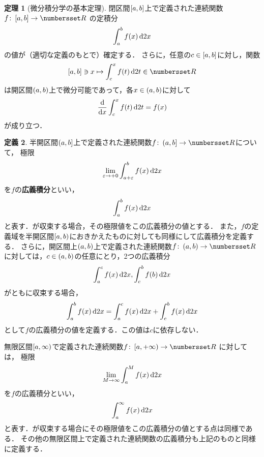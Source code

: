 \documentclass[11pt,a4paper]{ltjsarticle}
\newcommand*{\definition}[1]{\textbf{#1}}
\newcommand*{\intd}{\dl2}
\theoremstyle{definition}
\newtheorem{dfn}{定義}[section]
\newtheorem{thm}[dfn]{定理}
\begin{document}
\begin{thm}[微分積分学の基本定理] \label{thm:int}
  閉区間$\interval{c}{a,b}$上で定義された連続関数$f \colon \interval{c}{a,b} \to \Real$
  の定積分
  \begin{align}
    \int_a^b \apply{f}{x} \intd x
    \label{eq:int}
  \end{align}
  の値が（適切な定義のもとで）確定する．
  さらに，任意の$c \in \interval{c}{a,b}$に対し，関数
  \[
    \interval{c}{a,b} \ni x \mapsto \int_c^x \apply{f}{t} \intd t \in \Real
  \]
  は開区間$\interval{op}{a,b}$上で微分可能であって，各$x \in \interval{op}{a,b}$に対して
  \begin{align}
    \diff*{\int_c^x \apply{f}{t} \intd t}x = \apply{f}{x}
    \label{eq:intderi}
  \end{align}
  が成り立つ．
\end{thm}

\begin{dfn} \label{dfn:impint}
  半開区間$\interval{lop}{a,b}$上で定義された連続関数$f \colon \interval{lop}{a,b} \to \Real$について，
  極限
  \begin{align}
    \lim_{\varepsilon \to +0} \int_{a + \varepsilon}^b \apply{f}{x} \intd x
    \label{eq:impintlim}
  \end{align}
  を$f$の\definition{広義積分}といい，
  \begin{align}
    \int_a^b \apply{f}{x} \intd x
    \label{eq:impint}
  \end{align}
  と表す．が収束する場合，その極限値をこの広義積分の値とする．
  また，$f$の定義域を半開区間$\interval{rop}{a,b}$におきかえたものに対しても同様にして広義積分を定義する．
  さらに，開区間上$\interval{op}{a,b}$上で定義された連続関数$f \colon \interval{op}{a,b} \to \Real$
  に対しては，$c \in \interval{op}{a,b}$の任意にとり，2つの広義積分
  \begin{align*}
    \int_a^c \apply{f}{x} \intd x , \int_c^b \apply{f}{b} \intd x
  \end{align*}
  がともに収束する場合，
  \begin{align}
    \int_a^b \apply{f}{x} \intd x = \int_a^c \apply{f}{x} \intd x + \int_c^b \apply{f}{x} \intd x
    \label{eq:impintop}
  \end{align}
  として$f$の広義積分の値を定義する．この値は$c$に依存しない．

  無限区間$\interval{rop}{a, \infty}$で定義された連続関数$f \colon \interval{rop}{a , +\infty} \to \Real$
  に対しては，
  極限
  \begin{align}
    \lim_{M \to \infty} \int_a^M \apply{f}{x} \intd x
    \label{eq:impliminfty}
  \end{align}
  を$f$の広義積分といい，
  \begin{align}
    \int_a^{\infty} \apply{f}{x} \intd x
    \label{eq:impintinfty}
  \end{align}
  と表す．が収束する場合にその極限値をこの広義積分の値とする点は同様である．
  その他の無限区間上で定義された連続関数の広義積分も上記のものと同様に定義する．
\end{dfn}
\end{document}
